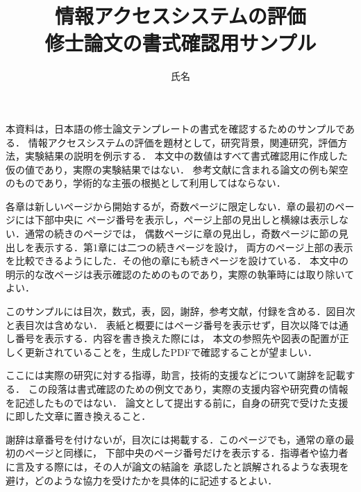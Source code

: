 \documentclass[a4paper,12pt,twoside,openany,dvipdfmx]{jsbook}
\title{情報アクセスシステムの評価\\修士論文の書式確認用サンプル}
\affiliation{早稲田大学大学院 基幹理工学研究科\\情報理工・情報通信専攻}
\author{氏名}
\begin{document}
\maketitle

\begin{coverabstract}
本資料は，日本語の修士論文テンプレートの書式を確認するためのサンプルである．
情報アクセスシステムの評価を題材として，研究背景，関連研究，評価方法，実験結果の説明を例示する．
本文中の数値はすべて書式確認用に作成した仮の値であり，実際の実験結果ではない．
参考文献に含まれる論文の例も架空のものであり，学術的な主張の根拠として利用してはならない．

各章は新しいページから開始するが，奇数ページに限定しない．章の最初のページには下部中央に
ページ番号を表示し，ページ上部の見出しと横線は表示しない．通常の続きのページでは，
偶数ページに章の見出し，奇数ページに節の見出しを表示する．第1章には二つの続きページを設け，
両方のページ上部の表示を比較できるようにした．その他の章にも続きページを設けている．
本文中の明示的な改ページは表示確認のためのものであり，実際の執筆時には取り除いてよい．

このサンプルには目次，数式，表，図，謝辞，参考文献，付録を含める．図目次と表目次は含めない．
表紙と概要にはページ番号を表示せず，目次以降では通し番号を表示する．内容を書き換えた際には，
本文の参照先や図表の配置が正しく更新されていることを，生成したPDFで確認することが望ましい．
\end{coverabstract}

\tableofcontents






\begin{acknowledgement}
ここには実際の研究に対する指導，助言，技術的支援などについて謝辞を記載する．
この段落は書式確認のための例文であり，実際の支援内容や研究費の情報を記述したものではない．
論文として提出する前に，自身の研究で受けた支援に即した文章に置き換えること．

謝辞は章番号を付けないが，目次には掲載する．このページでも，通常の章の最初のページと同様に，
下部中央のページ番号だけを表示する．指導者や協力者に言及する際には，その人が論文の結論を
承認したと誤解されるような表現を避け，どのような協力を受けたかを具体的に記述するとよい．
\end{acknowledgement}




\appendix

\end{document}
